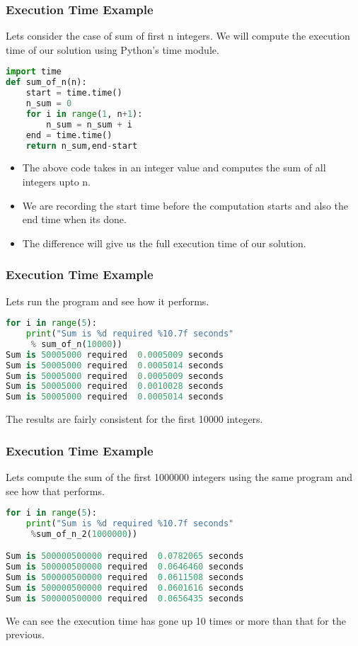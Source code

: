 \documentclass{beamer}
\begin{document}
\begin{frame}[fragile]
\frametitle{Execution Time Example}
Lets consider the case of sum of first n integers. We will compute the execution time of our solution using Python's time module.

\begin{lstlisting}[language=Python]
import time
def sum_of_n(n):
    start = time.time()
    n_sum = 0
    for i in range(1, n+1):
        n_sum = n_sum + i
    end = time.time()
    return n_sum,end-start
\end{lstlisting}
\begin{itemize}
\item The above code takes in an integer value and computes the sum of all integers upto n.
\item We are recording the start time before the computation starts and also the end time when its done.
\item The difference will give us the full execution time of our solution.
\end{itemize}

\end{frame}

\begin{frame}[fragile]
\frametitle{Execution Time Example}
Lets run the program and see how it performs.
\begin{lstlisting}[language=Python]
for i in range(5):
    print("Sum is %d required %10.7f seconds"
     % sum_of_n(10000))
Sum is 50005000 required  0.0005009 seconds
Sum is 50005000 required  0.0005014 seconds
Sum is 50005000 required  0.0005009 seconds
Sum is 50005000 required  0.0010028 seconds
Sum is 50005000 required  0.0005014 seconds
\end{lstlisting}
The results are fairly consistent for the first 10000 integers.
\end{frame}

\begin{frame}[fragile]
\frametitle{Execution Time Example}
Lets compute the sum of the first 1000000 integers using the same program and see how that performs.
\begin{lstlisting}[language=Python]
for i in range(5):
    print("Sum is %d required %10.7f seconds"
     %sum_of_n_2(1000000))

Sum is 500000500000 required  0.0782065 seconds
Sum is 500000500000 required  0.0646460 seconds
Sum is 500000500000 required  0.0611508 seconds
Sum is 500000500000 required  0.0601616 seconds
Sum is 500000500000 required  0.0656435 seconds
\end{lstlisting}
We can see the execution time has gone up 10 times or more than that for the previous.
\end{frame}
\end{document}
